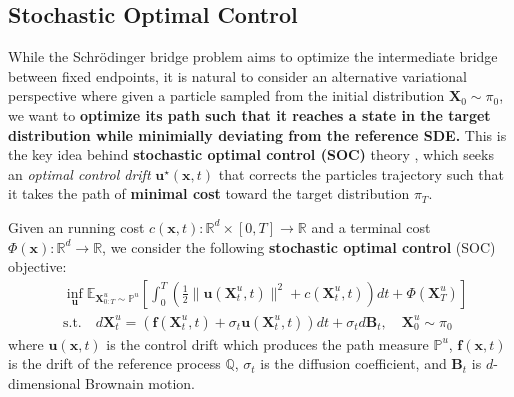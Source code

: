 \documentclass{article}
\newcommand{\boldtext}[1]{\textbf{\textcolor{MyGreen}{#1}}}
\begin{document}
\subsection{Stochastic Optimal Control}
\label{subsec:stochastic-optimal-control}
While the Schrödinger bridge problem aims to optimize the intermediate bridge between fixed endpoints, it is natural to consider an alternative variational perspective where given a particle sampled from the initial distribution $\boldsymbol{X}_0\sim \pi_0$, we want to \textbf{optimize its path such that it reaches a state in the target distribution while minimially deviating from the reference SDE.} This is the key idea behind \boldtext{stochastic optimal control (SOC)} theory \citep{nusken2021solving}, which seeks an \textit{optimal control drift} $\boldsymbol{u}^\star(\boldsymbol{x},t) $ that corrects the particles trajectory such that it takes the path of \textbf{minimal cost} toward the target distribution $\pi_T$. 
\begin{definition}\label{def:soc-objective}
    Given an running cost $c(\boldsymbol{x},t):\mathbb{R}^d\times[0,T]\to \mathbb{R}$ and a terminal cost $\Phi(\boldsymbol{x}):\mathbb{R}^d\to \mathbb{R}$, we consider the following \textbf{stochastic optimal control} (SOC) objective:
    \begin{align}
        &\inf_{\boldsymbol{u}}\mathbb{E}_{\boldsymbol{X}^u_{0:T}\sim \mathbb{P}^u}\left[\int_0^T\left(\frac{1}{2}\|\boldsymbol{u}(\boldsymbol{X}^u_t,t)\|^2+c(\boldsymbol{X}^u_t,t)\right)dt+\Phi(\boldsymbol{X}^u_T)\right]\tag{SOC Objective}\label{eq:soc-objective}\\
        &\text{s.t.}\quad d\boldsymbol{X}^u_t=\left(\boldsymbol{f}(\boldsymbol{X}^u_t,t)+\sigma_t\boldsymbol{u}(\boldsymbol{X}^u_t,t)\right)dt+\sigma_td\boldsymbol{B}_t, \quad \boldsymbol{X}^u_0\sim \pi_0\nonumber
    \end{align}
    where $\boldsymbol{u}(\boldsymbol{x},t)$ is the control drift which produces the path measure $\mathbb{P}^u$, $\boldsymbol{f}(\boldsymbol{x},t)$ is the drift of the reference process $\mathbb{Q}$, $\sigma_t$ is the diffusion coefficient, and $\boldsymbol{B}_t$ is $d$-dimensional Brownain motion.
\end{definition}
\end{document}
